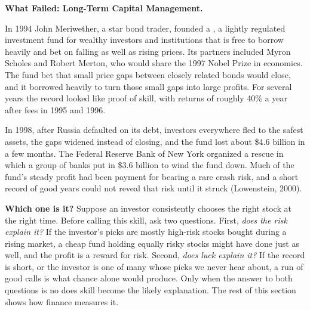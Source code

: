 \begin{callout}
\textbf{What Failed: Long-Term Capital Management.} 

In 1994 John Meriwether, a star bond trader, founded a , a lightly regulated investment fund for wealthy investors and institutions that is free to borrow heavily and bet on falling as well as rising prices. Its partners included Myron Scholes and Robert Merton, who would share the 1997 Nobel Prize in economics. The fund bet that small price gaps between closely related bonds would close, and it borrowed heavily to turn those small gaps into large profits. For several years the record looked like proof of skill, with returns of roughly 40\% a year after fees in 1995 and 1996. 

In 1998, after Russia defaulted on its debt, investors everywhere fled to the safest assets, the gaps widened instead of closing, and the fund lost about \$4.6 billion in a few months. The Federal Reserve Bank of New York organized a rescue in which a group of banks put in \$3.6 billion to wind the fund down. Much of the fund's steady profit had been payment for bearing a rare crash risk, and a short record of good years could not reveal that risk until it struck (Lowenstein, 2000).
\end{callout}


\noindent\textbf{Which one is it?} Suppose an investor
consistently chooses the right stock at the right time. Before calling this
skill, ask two questions. First, \emph{does the risk explain it?} If the
investor's picks are mostly high-risk stocks bought during a rising market,
a cheap fund holding equally risky stocks might have done just as well, and
the profit is a reward for risk. Second, \emph{does luck explain it?} If the
record is short, or the investor is one of many whose picks we never hear
about, a run of good calls is what chance alone would produce. Only when the
answer to both questions is no does skill become the likely explanation. The
rest of this section shows how finance measures it.

